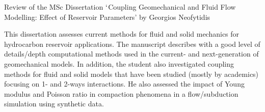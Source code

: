 \documentclass[14pt,twoside]{report}
\begin{document}



\vfill

\clearpage



\bigskip

\begin{center}
{\Large Review of the MSc Dissertation $\lq$Coupling Geomechanical and Fluid Flow Modelling: Effect of Reservoir Parameters' by Georgios Neofytidis}
\end{center}

\medskip

This dissertation assesses current methods for fluid and solid mechanics for hydrocarbon reservoir applications. The manuscript describes with a good level of details/depth computational methods used in the current- and next-generation of geomechanical models. In addition, the student also investigated coupling methods for fluid and solid models that have been studied (mostly by academics) focusing on 1- and 2-ways interactions. He also assessed the impact of Young modulus and Poisson ratio in compaction phenomena in a flow/subduction simulation using synthetic data.
\end{document}
